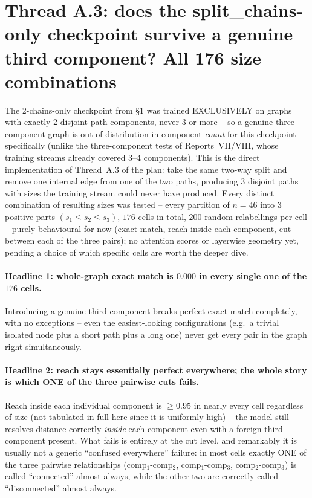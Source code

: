 \documentclass[11pt,a4paper]{article}
\begin{document}
\clearpage
\section{Thread A.3: does the split\_chains-only checkpoint survive a genuine third
component? All 176 size combinations}

The 2-chains-only checkpoint from \S1 was trained EXCLUSIVELY on graphs with exactly 2 disjoint
path components, never 3 or more -- so a genuine three-component graph is out-of-distribution in
component \emph{count} for this checkpoint specifically (unlike the three-component tests of
Reports~VII/VIII, whose training streams already covered 3--4 components). This is the direct
implementation of Thread~A.3 of the plan: take the same two-way split and remove one internal
edge from one of the two paths, producing 3 disjoint paths with sizes the training stream could
never have produced. Every distinct combination of resulting sizes was tested -- every partition
of $n=46$ into 3 positive parts $(s_1\le s_2\le s_3)$, $176$ cells in total, $200$ random
relabellings per cell -- purely behavioural for now (exact match, reach inside each component,
cut between each of the three pairs); no attention scores or layerwise geometry yet, pending a
choice of which specific cells are worth the deeper dive.

\paragraph{Headline 1: whole-graph exact match is $0.000$ in every single one of the $176$
cells.} Introducing a genuine third component breaks perfect exact-match completely, with no
exceptions -- even the easiest-looking configurations (e.g.\ a trivial isolated node plus a
short path plus a long one) never get every pair in the graph right simultaneously.

\paragraph{Headline 2: reach stays essentially perfect everywhere; the whole story is which ONE
of the three pairwise cuts fails.} Reach inside each individual component is $\ge0.95$ in nearly
every cell regardless of size (not tabulated in full here since it is uniformly high) -- the
model still resolves distance correctly \emph{inside} each component even with a foreign third
component present. What fails is entirely at the cut level, and remarkably it is usually not a
generic ``confused everywhere'' failure: in most cells exactly ONE of the three pairwise
relationships (comp$_1$-comp$_2$, comp$_1$-comp$_3$, comp$_2$-comp$_3$) is called ``connected''
almost always, while the other two are correctly called ``disconnected'' almost always.
\end{document}
